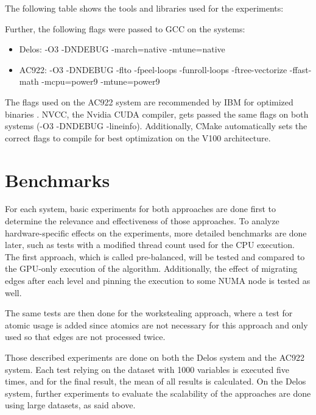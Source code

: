 The following table shows the tools and libraries used for the experiments:


Further, the following flags were passed to GCC on the systems:
\begin{itemize}
  \item Delos: -O3 -DNDEBUG -march=native -mtune=native
  \item AC922: -O3 -DNDEBUG -flto -fpeel-loops -funroll-loops -ftree-vectorize -ffast-math -mcpu=power9 -mtune=power9
\end{itemize}
The flags used on the AC922 system are recommended by IBM for optimized binaries \cite{LinuxIBMPower}. NVCC, the Nvidia CUDA compiler, gets passed the same flags on both systems (-O3 -DNDEBUG -lineinfo). Additionally, CMake automatically sets the correct flags to compile for best optimization on the V100 architecture.

\section{Benchmarks}
For each system, basic experiments for both approaches are done first to determine the relevance and effectiveness of those approaches. To analyze hardware-specific effects on the experiments, more detailed benchmarks are done later, such as tests with a modified thread count used for the CPU execution.
The first approach, which is called pre-balanced, will be tested and compared to the GPU-only execution of the algorithm. Additionally, the effect of migrating edges after each level and pinning the execution to some NUMA node is tested as well.

The same tests are then done for the workstealing approach, where a test for atomic usage is added since atomics are not necessary for this approach and only used so that edges are not processed twice.

Those described experiments are done on both the Delos system and the AC922 system. Each test relying on the dataset with 1000 variables is executed five times, and for the final result, the mean of all results is calculated. On the Delos system, further experiments to evaluate the scalability of the approaches are done using large datasets, as said above.

